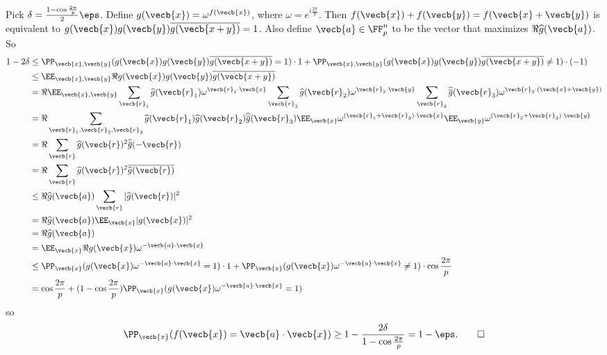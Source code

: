 Pick $\delta=\frac{1-\cos\frac{2\pi}{p}}{2}\eps$. Define $g(\vecb{x})=\omega^{f(\vecb{x})}$, where $\omega=e^{i\frac{2\pi}{p}}$. Then $f(\vecb{x})+f(\vecb{y})=f(\vecb{x}+\vecb{y})$ is equivalent to $g(\vecb{x})g(\vecb{y})\overline{g(\vecb{x+y})}=1$. Also define $\vecb{a}\in\FF_p^n$ to be the vector that maximizes $\Re\widehat{g}(\vecb{a})$. So
\begin{align*}
	1-2\delta &\leq \PP_{\vecb{x},\vecb{y}}(g(\vecb{x})g(\vecb{y})\overline{g(\vecb{x+y})}=1)\cdot1+\PP_{\vecb{x},\vecb{y}}(g(\vecb{x})g(\vecb{y})\overline{g(\vecb{x+y})}\neq1)\cdot(-1) \\
	&\leq \EE_{\vecb{x},\vecb{y}}\Re g(\vecb{x})g(\vecb{y})\overline{g(\vecb{x+y})} \\
	&= \Re\EE_{\vecb{x},\vecb{y}}\sum_{\vecb{r}_1}\widehat{g}(\vecb{r}_1)\omega^{\vecb{r}_1\cdot\vecb{x}}\sum_{\vecb{r}_2}\widehat{g}(\vecb{r}_2)\omega^{\vecb{r}_2\cdot\vecb{y}}\sum_{\vecb{r}_3}\widehat{\overline{g}}(\vecb{r}_3)\omega^{\vecb{r}_3\cdot(\vecb{x}+\vecb{y})} \\
	&= \Re\sum_{\vecb{r}_1,\vecb{r}_2,\vecb{r}_3}\widehat{g}(\vecb{r}_1)\widehat{g}(\vecb{r}_2)\widehat{\overline{g}}(\vecb{r}_3)\EE_{\vecb{x}}\omega^{(\vecb{r}_1+\vecb{r}_3)\cdot\vecb{x}}\EE_{\vecb{y}}\omega^{(\vecb{r}_2+\vecb{r}_3)\cdot\vecb{y}} \\
	&= \Re\sum_{\vecb{r}}\widehat{g}(\vecb{r})^2\widehat{\overline{g}}(-\vecb{r}) \\
	&= \Re\sum_{\vecb{r}}\widehat{g}(\vecb{r})^2\overline{\widehat{g}(\vecb{r})} \\
	&\leq \Re\widehat{g}(\vecb{a})\sum_{\vecb{r}}|\widehat{g}(\vecb{r})|^2 \\
	&= \Re\widehat{g}(\vecb{a})\EE_{\vecb{x}}|g(\vecb{x})|^2 \\
	&= \Re\widehat{g}(\vecb{a}) \\
	&= \EE_{\vecb{x}}\Re g(\vecb{x})\omega^{-\vecb{a}\cdot\vecb{x}} \\
	&\leq \PP_{\vecb{x}}(g(\vecb{x})\omega^{-\vecb{a}\cdot\vecb{x}}=1)
	\cdot1+\PP_{\vecb{x}}(g(\vecb{x})\omega^{-\vecb{a}\cdot\vecb{x}}\neq1)
	\cdot\cos\frac{2\pi}{p} \\
	&= \cos\frac{2\pi}{p}+(1-\cos\frac{2\pi}{p})\PP_{\vecb{x}}(g(\vecb{x})\omega^{-\vecb{a}\cdot\vecb{x}}=1)
\end{align*}
so
\[
	\PP_{\vecb{x}}(f(\vecb{x})=\vecb{a}\cdot\vecb{x})\geq1-\frac{2\delta}{1-\cos\frac{2\pi}{p}}=1-\eps.\qedhere
\]